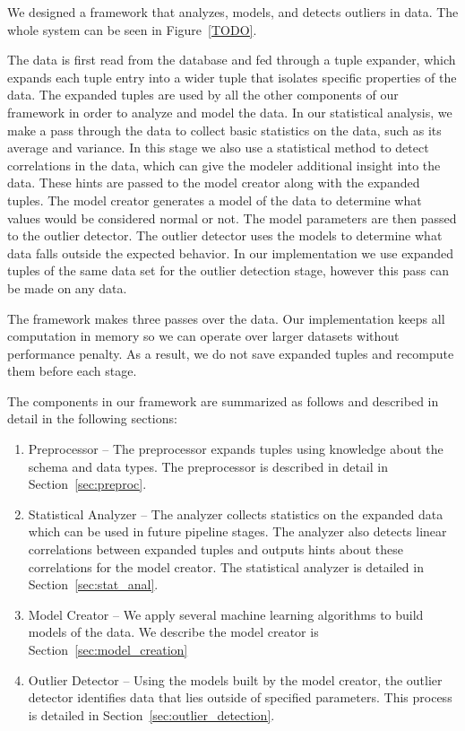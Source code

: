 We designed a framework that analyzes, models, and detects outliers in data.
The whole system can be seen in Figure~\ref{TODO}.

The data is first read from the database and fed through a tuple expander, which expands each tuple entry into a wider tuple that isolates specific properties of the data.
The expanded tuples are used by all the other components of our framework in order to analyze and model the data.
In our statistical analysis, we make a pass through the data to collect basic statistics on the data, such as its average and variance.
In this stage we also use a statistical method to detect correlations in the data, which can give the modeler additional insight into the data.
These hints are passed to the model creator along with the expanded tuples.
The model creator generates a model of the data to determine what values would be considered normal or not.
The model parameters are then passed to the outlier detector.
The outlier detector uses the models to determine what data falls outside the expected behavior.
In our implementation we use expanded tuples of the same data set for the outlier detection stage, however this pass can be made on any data.

The framework makes three passes over the data.
Our implementation keeps all computation in memory so we can operate over larger datasets without performance penalty.
As a result, we do not save expanded tuples and recompute them before each stage.

The components in our framework are summarized as follows and described in detail in the following sections:
\begin{enumerate}
\item Preprocessor -- The preprocessor expands tuples using knowledge about the schema and data types. The preprocessor is described in detail in Section~\ref{sec:preproc}.
\item Statistical Analyzer -- The analyzer collects statistics on the expanded data which can be used in future pipeline stages. The analyzer also detects linear correlations between expanded tuples and outputs hints about these correlations for the model creator. The statistical analyzer is detailed in Section~\ref{sec:stat_anal}. 
\item Model Creator -- We apply several machine learning algorithms to build models of the data. We describe the model creator is Section~\ref{sec:model_creation}
\item Outlier Detector -- Using the models built by the model creator, the outlier detector identifies data that lies outside of specified parameters. This process is detailed in Section~\ref{sec:outlier_detection}.
\end{enumerate}


